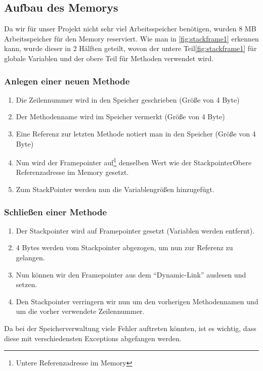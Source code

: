 \subsection{Aufbau des Memorys}
Da wir für unser Projekt nicht sehr viel Arbeitsspeicher benötigen, wurden 8 MB Arbeitsspeicher für den Memory reserviert.
Wie man in \ref{fig:stackframe1} erkennen kann, wurde dieser in 2 Hälften geteilt, wovon der untere Teil\ref{fig:stackframe1} für globale Variablen
und der obere Teil für Methoden verwendet wird.


\subsubsection{Anlegen einer neuen Methode}
\begin{enumerate}
 \item Die Zeilennummer wird in den Speicher geschrieben (Größe von 4 Byte)
 \item Der Methodenname wird im Speicher vermerkt (Größe von 4 Byte)
 \item Eine Referenz zur letzten Methode notiert man in den Speicher (Größe von 4 Byte)
 \item Nun wird der Framepointer auf\footnote{Untere Referenzadresse im Memory} denselben Wert wie der Stackpointer{Obere Referenzadresse im Memory} gesetzt.
 \item Zum StackPointer werden nun die Variablengrößen hinzugefügt.
\end{enumerate}
 
\subsubsection{Schließen einer Methode}
\begin{enumerate}
 \item Der Stackpointer wird auf Framepointer gesetzt (Variablen werden entfernt).
 \item 4 Bytes werden vom Stackpointer abgezogen, um nun zur Referenz zu gelangen.
 \item Nun können wir den Framepointer aus dem ``Dynamic-Link'' auslesen und setzen.
 \item Den Stackpointer verringern wir nun um den vorherigen Methodennamen und um die vorher verwendete Zeilennummer.
\end{enumerate}

Da bei der Speicherverwaltung viele Fehler auftreten könnten, ist es wichtig, dass diese mit verschiedensten Exceptions abgefangen werden.

